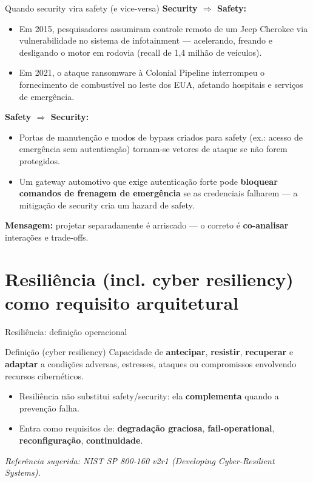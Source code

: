 \documentclass{beamer}
\begin{document}
\begin{frame}{Quando security vira safety (e vice-versa)}
\small
\textbf{Security $\Rightarrow$ Safety:}
\begin{itemize}
  \item Em 2015, pesquisadores assumiram controle remoto de um Jeep Cherokee via vulnerabilidade no sistema de infotainment --- acelerando, freando e desligando o motor em rodovia (recall de 1,4 milhão de veículos).
  \item Em 2021, o ataque ransomware à Colonial Pipeline interrompeu o fornecimento de combustível no leste dos EUA, afetando hospitais e serviços de emergência.
\end{itemize}

\vspace{0.3em}
\textbf{Safety $\Rightarrow$ Security:}
\begin{itemize}
  \item Portas de manutenção e modos de bypass criados para safety (ex.: acesso de emergência sem autenticação) tornam-se vetores de ataque se não forem protegidos.
  \item Um gateway automotivo que exige autenticação forte pode \textbf{bloquear comandos de frenagem de emergência} se as credenciais falharem --- a mitigação de security cria um hazard de safety.
\end{itemize}

\vspace{0.3em}
\textbf{Mensagem:} projetar separadamente é arriscado --- o correto é \textbf{co-analisar} interações e trade-offs.
\end{frame}

\section{Resiliência (incl. cyber resiliency) como requisito arquitetural}

\begin{frame}{Resiliência: definição operacional}
\begin{block}{Definição (cyber resiliency)}
Capacidade de \textbf{antecipar}, \textbf{resistir}, \textbf{recuperar} e \textbf{adaptar} a condições adversas, estresses, ataques ou compromissos envolvendo recursos cibernéticos.
\end{block}

\begin{itemize}
  \item Resiliência não substitui safety/security: ela \textbf{complementa} quando a prevenção falha.
  \item Entra como requisitos de: \textbf{degradação graciosa}, \textbf{fail-operational}, \textbf{reconfiguração}, \textbf{continuidade}.
\end{itemize}

\small
\textit{Referência sugerida: NIST SP 800-160 v2r1 (Developing Cyber-Resilient Systems).}
\end{frame}
\end{document}
